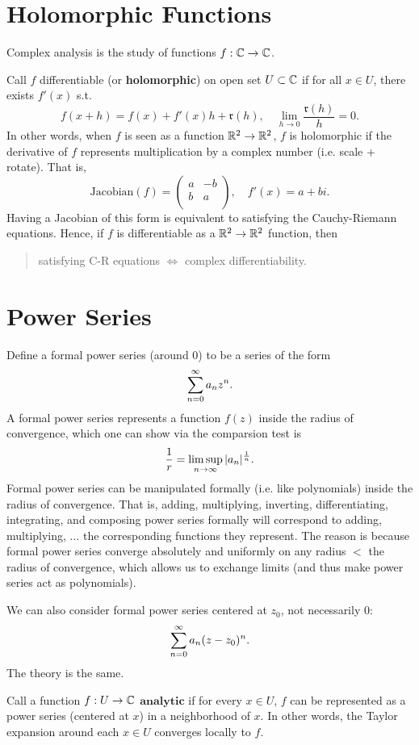 \section{Holomorphic Functions}
Complex analysis is the study of functions $f: {\mathbb C} \to {\mathbb C}$.

Call $f$ differentiable (or \textbf{holomorphic}) on open set $U \subset {\mathbb C}$ if for all $x \in U$, there exists $f'(x)$ s.t.
\[
    f(x + h) = f(x) + f'(x)h + \mathfrak r(h), \quad \lim_{h \to 0} \frac{\mathfrak r(h)}{h} = 0.
\]
In other words, when $f$ is seen as a function ${\mathbb R}^2 \to {\mathbb R}^2$, $f$ is holomorphic if the derivative of $f$ represents multiplication by a complex number (i.e. scale + rotate). That is,
\[
    \text{Jacobian}(f) =
    \begin{pmatrix}
        a & -b \\
        b  & a \\
    \end{pmatrix},
    \quad f'(x) = a + bi.
\]
Having a Jacobian of this form is equivalent to satisfying the Cauchy-Riemann equations. Hence, if $f$ is differentiable as a ${\mathbb R}^2 \to {\mathbb R}^2$ function, then
\begin{quote}
    satisfying C-R equations $\iff$ complex differentiability.
\end{quote}

\section{Power Series}
Define a formal power series (around 0) to be a series of the form
\[
    \sum_{n = 0}^\infty a_nz^n.
\]
A formal power series represents a function $f(z)$ inside the radius of convergence, which one can show via the comparsion test is
\[
    \frac{1}{r} = \limsup_{n \to \infty} |a_n|^{\frac{1}{n}}.
\]
Formal power series can be manipulated formally (i.e. like polynomials) inside the radius of convergence. That is, adding, multiplying, inverting, differentiating, integrating, and composing power series formally will correspond to adding, multiplying, $\dots$ the corresponding functions they represent. The reason is because formal power series converge absolutely and uniformly on any radius $<$ the radius of convergence, which allows us to exchange limits (and thus make power series act as polynomials).

We can also consider formal power series centered at $z_0$, not necessarily 0:
\[
    \sum_{n = 0}^\infty a_n(z-z_0)^n.
\]
The theory is the same.

Call a function $f: U \to {\mathbb C}$ $\textbf{analytic}$ if for every $x \in U$, $f$ can be represented as a power series (centered at $x$) in a neighborhood of $x$. In other words, the Taylor expansion around each $x \in U$ converges locally to $f$.

